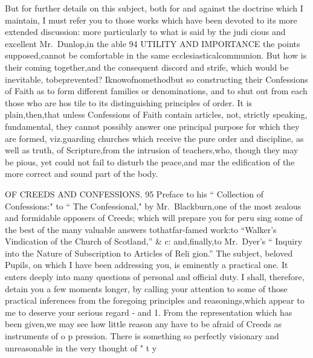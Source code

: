 \documentclass[
]{book}
\begin{document}
But for further details on this subject, both for and against the doctrine which I maintain, I must refer you to those works which have been devoted to its more extended discussion: more particularly to what is said by the judi cious and excellent Mr.~Dunlop,in the able
94 UTILITY AND IMPORTANCE
the points supposed,cannot be comfortable in the same ecclesiasticalcommunion. But how
is their coming together,and the consequent
discord and strife, which would be inevitable, tobeprevented? Iknowofnomethodbut so constructing their Confessions of Faith as to form different families or denominations, and to shut out from each those who are hos
tile to its distinguishing principles of order. It is plain,then,that unless Confessions of Faith contain articles, not, strictly speaking,
fundamental, they cannot possibly answer one principal purpose for which they are formed,
viz.guarding churches which receive the pure order and discipline, as well as truth, of Scripture,from the intrusion of teachers,who, though they may be pious, yet could not fail to disturb the peace,and mar the edification of the more correct and sound part of the body.

OF CREEDS AND CONFESSIONS. 95
Preface to his `` Collection of Confessions:" to
`` The Confessional," by Mr.~Blackburn,one of the most zealous and formidable opposers
of Creeds; which will prepare you for peru sing some of the best of the many valuable answers tothatfar-famed work:to ``Walker's Vindication of the Church of Scotland,'' \& c: and,finally,to Mr.~Dyer's `` Inquiry into the Nature of Subscription to Articles of Reli
gion.''
The subject, beloved Pupils, on which I have been addressing you, is eminently a practical one. It enters deeply into many questions of personal and official duty. I shall, therefore, detain you a few moments longer, by calling your attention to some of those practical inferences from the foregoing principles and reasonings,which appear to me to deserve your serious regard - and
1. From the representation which has been
given,we may see how little reason any have to be afraid of Creeds as instruments of o p
pression.
There is something so perfectly visionary and unreasonable in the very thought of " t y
\end{document}
